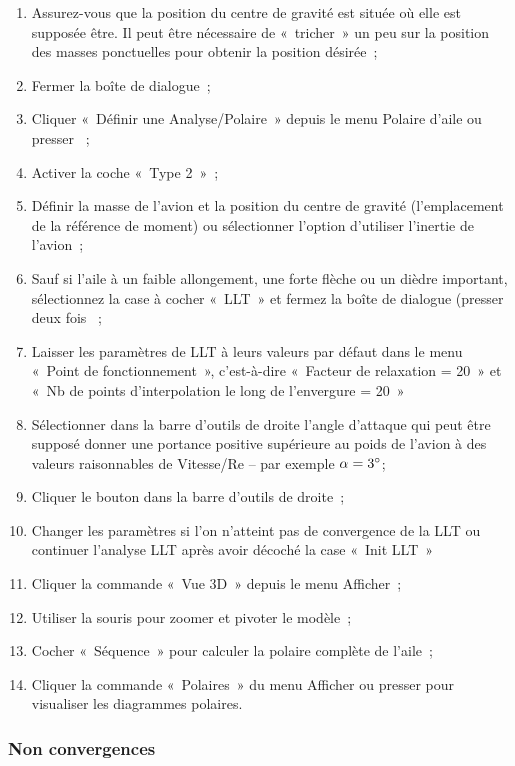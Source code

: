 \documentclass[a4paper,twoside,12pt,dvips]{article}
\begin{document}
\begin{enumerate}
	\item Assurez-vous que la position du centre de gravité est située où elle
	est supposée être. Il peut être nécessaire de «~tricher~» un peu sur la
	position des masses ponctuelles pour obtenir la position désirée~;
	\item Fermer la boîte de dialogue~;
	\item Cliquer «~Définir une Analyse/Polaire~» depuis le menu Polaire d’aile
	ou presser ~;
	\item Activer la coche «~Type 2~»~;
	\item Définir la masse de l’avion et la position du centre de gravité 
	(l’emplacement de la référence de moment) ou sélectionner l’option 
	d’utiliser l’inertie de l’avion~;
	\item Sauf si l’aile à un faible allongement, une forte flèche ou un dièdre
	important, sélectionnez la case à cocher «~LLT~» et fermez la boîte de 
	dialogue (presser deux fois ~;
	\item Laisser les paramètres de LLT à leurs valeurs par défaut dans le menu
	 «~Point de fonctionnement~», c’est-à-dire «~Facteur de relaxation = 20~» et
	 «~Nb de points d’interpolation le long de l’envergure = 20~» 
	 \item Sélectionner dans la barre d’outils de droite l’angle d’attaque qui
	 peut être supposé donner une portance positive supérieure au poids de 
	 l’avion à des valeurs raisonnables de Vitesse/Re – par exemple $\alpha = 
	 3\degree$;
	\item Cliquer le bouton  dans la barre d’outils de droite~;
	\item Changer les paramètres si l’on n’atteint pas de convergence de la
	LLT ou continuer l’analyse LLT après avoir décoché la case «~Init LLT~»
	\item Cliquer la commande «~Vue 3D~» depuis le menu Afficher~;
	\item Utiliser la souris pour zoomer et pivoter le modèle~;
	\item Cocher «~Séquence~» pour calculer la polaire complète de l’aile~;
	\item Cliquer la commande «~Polaires~» du menu Afficher ou presser
	 pour visualiser les diagrammes polaires.
\end{enumerate}

\subsubsection{Non convergences}
\end{document}
